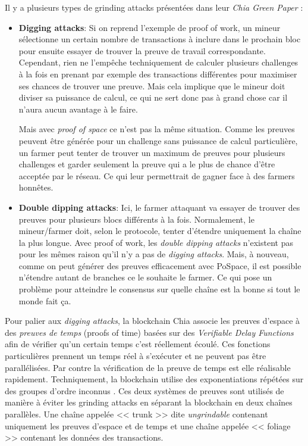 Il y a plusieurs types de grinding attacks présentées dans leur \emph{Chia Green Paper} \cite{chia:greenpaper} :

\begin{itemize}
  \item \textbf{Digging attacks}: Si on reprend l'exemple de proof of work, un mineur sélectionne un certain nombre de transactions à inclure dans le prochain bloc pour ensuite essayer de trouver la preuve de travail correspondante. Cependant, rien ne l'empêche techniquement de calculer plusieurs challenges à la fois en prenant par exemple des transactions différentes pour maximiser ses chances de trouver une preuve. Mais cela implique que le mineur doit diviser sa puissance de calcul, ce qui ne sert donc pas à grand chose car il n'aura aucun avantage à le faire.
  
  Mais avec \emph{proof of space} ce n'est pas la même situation. Comme les preuves peuvent être générée pour un challenge sans puissance de calcul particulière, un farmer peut tenter de trouver un maximum de preuves pour plusieurs challenges et garder seulement la preuve qui a le plus de chance d'être acceptée par le réseau. Ce qui leur permettrait de gagner face à des farmers honnêtes.
  \item \textbf{Double dipping attacks}: Ici, le farmer attaquant va essayer de trouver des preuves pour plusieurs blocs différents à la fois. Normalement, le mineur/farmer doit, selon le protocole, tenter d'étendre uniquement la chaîne la plus longue. Avec proof of work, les \emph{double dipping attacks} n'existent pas pour les mêmes raison qu'il n'y a pas de \emph{digging attacks}. Mais, à nouveau, comme on peut générer des preuves efficacement avec PoSpace, il est possible n'étendre autant de branches ce le souhaite le farmer. Ce qui pose un problème pour atteindre le consensus sur quelle chaîne est la bonne si tout le monde fait ça. 
\end{itemize}

Pour palier aux \emph{digging attacks}, la blockchain Chia associe les preuves d'espace à des \emph{preuves de temps} (proofs of time) basées sur des \emph{Verifiable Delay Functions} afin de vérifier qu'un certain temps c'est réellement écoulé. Ces fonctions particulières prennent un temps réel à s'exécuter et ne peuvent pas être parallélisées. Par contre la vérification de la preuve de temps est elle réalisable rapidement. Techniquement, la blockchain utilise des exponentiations répétées sur des groupes d'ordre inconnus \cite{DBLP:conf/crypto/BonehBBF18} \cite{DBLP:conf/innovations/Pietrzak19a} \cite{DBLP:conf/eurocrypt/Wesolowski19}. Ces deux systèmes de preuves sont utilisés de manière à éviter les grinding attacks en séparant la blockchain en deux chaînes parallèles. Une chaîne appelée << trunk >> dite \emph{ungrindable} contenant uniquement les preuves d'espace et de temps et une chaîne appelée << foliage >> contenant les données des transactions.

